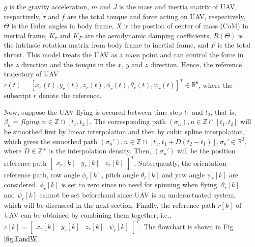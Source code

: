 \documentclass{ieeeaccess}
\begin{document}
$g$ is the gravity acceleration, $m$ and $J$ is the mass and inertia matrix of UAV, respectively, $\tau$ and $f$ are the total touque and force acting on UAV, respectively, $\Theta$ is the Euler angles in body frame, $X$ is the postion of center of mass (CoM) in inertial frame, $K_\tau$ and $K_F$ are the aerodynamic damping coefficients, $R(\Theta)$ is the intrinsic rotation matrix from body frame to inertial frame, and $F$ is the total thrust. This model treats the UAV as a mass point and can control the force in the $z$ direction and the touque in the $x$, $y$ and $z$ direction. Hence, the reference trajectory of UAV $r(t)=[x_r(t),y_r(t),z_r(t),\phi_r(t),\theta_r(t),\psi_r(t)]^T\in\mathbb{R}^{6}$, where the subscript $r$ denote the reference.

Now, suppose the UAV flying is occured between time step $t_1$ and $t_2$, that is, $\beta_n={flying}, n\in\mathbb{Z}\cap[t_1,t_2]$. The corresponding path $(\sigma_n), n\in\mathbb{Z}\cap[t_1,t_2]$ will be smoothed first by linear interpolation and then by cubic spline interpolation, which gives the smoothed path $(\sigma_n'), n\in\mathbb{Z}\cap[t_1,t_1+D(t_2-t_1)], \sigma_n'\in\mathbb{R}^3$, where $D\in\mathbb{Z}^+$ is the interpolation density. Then, $(\sigma_n')$ will be the position reference path $\begin{bmatrix}
    x_r[k] & y_r[k] & z_r[k]
\end{bmatrix}^T$. Subsequently, the orientation reference path, row angle $\phi_r[k]$, pitch angle $\theta_r[k]$ and yaw angle $\psi_r[k]$ are considered. $\phi_r[k]$ is set to zero since no need for spinning when flying. $\theta_r[k]$ and $\psi_r[k]$ cannot be set beforehand since UAV is an underactuated system, which will be discussed in the next section. Finally, the reference path $r[k]$ of UAV can be obtained by combining them together, i.e., $r[k] = \begin{bmatrix}
    x_r[k] & y_r[k] & z_r[k] & \psi_r[k]
\end{bmatrix}^T$. The flowchart is shown in Fig. \ref{fig:FandW}.


\end{document}
